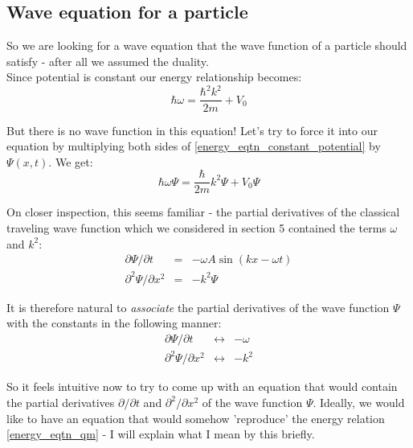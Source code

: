 \documentclass[12pt]{article}
\begin{document}
\subsection{Wave equation for a particle}
So we are looking for a wave equation that the wave function of a particle should satisfy - after all we assumed the duality. 
\\ \indent Since potential is constant our energy 
 relationship becomes:
\begin{equation}
\label{energy_eqtn_constant_potential}
\hbar \omega = \frac{\hbar^2 k^2}{2m} + V_0
\end{equation} 

But there is no wave function in this equation! Let's try to force it into 
our equation by multiplying both sides of 
\eqref{energy_eqtn_constant_potential} 
by $\Psi(x, t)$. We get:
\begin{equation}
\label{energy_times_psi}
\hbar \omega \Psi = \frac{\hbar}{2m}k^2 \Psi + V_0 \Psi
\end{equation}

On closer inspection, this seems familiar - the partial derivatives of the classical 
traveling wave function which we considered in section 5 contained the terms $\omega$ and $k^2$:
\begin{eqnarray}
\label{associations_constants}
\partial \Psi / \partial t &=& - \omega A \sin (kx - \omega t) \\
\nonumber
\partial^2 \Psi / \partial x^2 &=& -k^2 \Psi
\end{eqnarray}

It is therefore natural to \textit{associate} the partial derivatives 
of the wave function $\Psi$ with the constants in the following manner:
\begin{eqnarray}
\nonumber
\partial \Psi / \partial t & \longleftrightarrow & -\omega \\
\nonumber
\partial^2 \Psi / \partial x^2 & \longleftrightarrow & -k^2
\end{eqnarray}

So it feels intuitive now to try to come up with 
an equation that would contain the partial derivatives $\partial/\partial t$ and 
$\partial^2 / \partial x^2$ of the wave function $\Psi$. 
Ideally, we would like to have an equation that would somehow 
'reproduce' the energy relation \eqref{energy_eqtn_qm} - I will explain what I 
mean by this briefly. 
\end{document}
